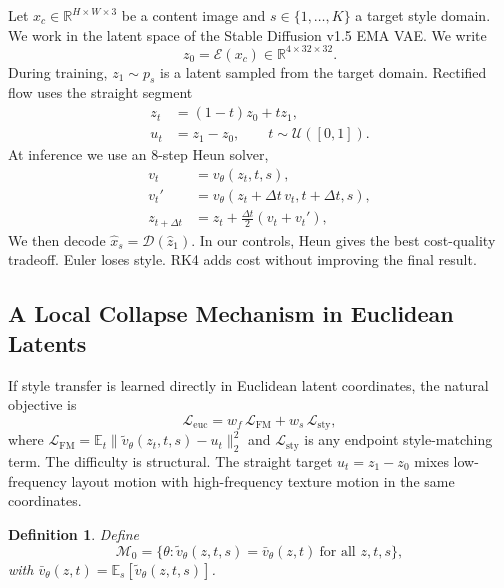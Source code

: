 \documentclass[letterpaper]{article}
\newtheorem{definition}{Definition}
\begin{document}
Let $x_c \in \mathbb{R}^{H \times W \times 3}$ be a content image and $s \in \{1,\ldots,K\}$ a target style domain.
We work in the latent space of the Stable Diffusion v1.5 EMA VAE.
We write
\begin{equation}
z_0 = \mathcal{E}(x_c) \in \mathbb{R}^{4 \times 32 \times 32}.
\end{equation}
During training, $z_1 \sim p_s$ is a latent sampled from the target domain. Rectified flow uses the straight segment
\begin{equation}
\begin{aligned}
z_t &= (1-t)z_0 + tz_1,\\
u_t &= z_1 - z_0, \qquad t \sim \mathcal U([0,1]).
\end{aligned}
\label{eq:fm}
\end{equation}
At inference we use an 8-step Heun solver,
\begin{equation}
\begin{aligned}
v_t &= v_\theta(z_t,t,s),\\
v_t' &= v_\theta(z_t + \Delta t\,v_t, t+\Delta t, s),\\
z_{t+\Delta t} &= z_t + \frac{\Delta t}{2}\left(v_t + v_t'\right),
\end{aligned}
\end{equation}
We then decode $\hat x_s = \mathcal D(\hat z_1)$.
In our controls, Heun gives the best cost-quality tradeoff.
Euler loses style.
RK4 adds cost without improving the final result.

\subsection{A Local Collapse Mechanism in Euclidean Latents}
\label{sec:attractor}

If style transfer is learned directly in Euclidean latent coordinates, the natural objective is
\begin{equation}
\mathcal L_{\mathrm{euc}}
=
w_f\,\mathcal L_{\mathrm{FM}}
+ w_s\,\mathcal L_{\mathrm{sty}},
\label{eq:euc}
\end{equation}
where
\(
\mathcal L_{\mathrm{FM}}
=
\mathbb E_t\|\tilde v_\theta(z_t,t,s)-u_t\|_2^2
\)
and $\mathcal L_{\mathrm{sty}}$ is any endpoint style-matching term.
The difficulty is structural.
The straight target $u_t=z_1-z_0$ mixes low-frequency layout motion with high-frequency texture motion in the same coordinates.

\begin{definition}
\label{def:attractor}
Define
\begin{equation}
\mathcal M_0
=
\{\theta:\tilde v_\theta(z,t,s)=\bar v_\theta(z,t)\ \text{for all } z,t,s\},
\end{equation}
with $\bar v_\theta(z,t)=\mathbb E_s[\tilde v_\theta(z,t,s)]$.
\end{definition}
\end{document}
